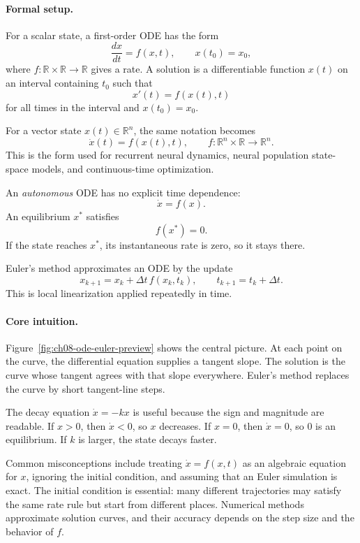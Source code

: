 \paragraph{Formal setup.}
For a scalar state, a first-order ODE has the form
\[
\frac{dx}{dt}=f(x,t),
\qquad
x(t_0)=x_0,
\]
where \(f:\mathbb{R}\times\mathbb{R}\to\mathbb{R}\) gives a rate. A solution is a differentiable function \(x(t)\) on an interval containing \(t_0\) such that
\[
x'(t)=f(x(t),t)
\]
for all times in the interval and \(x(t_0)=x_0\).

For a vector state \(x(t)\in\mathbb{R}^n\), the same notation becomes
\[
\dot x(t)=f(x(t),t),
\qquad
f:\mathbb{R}^n\times\mathbb{R}\to\mathbb{R}^n.
\]
This is the form used for recurrent neural dynamics, neural population state-space models, and continuous-time optimization.

An \emph{autonomous} ODE has no explicit time dependence:
\[
\dot x=f(x).
\]
An equilibrium \(x^\ast\) satisfies
\[
f(x^\ast)=0.
\]
If the state reaches \(x^\ast\), its instantaneous rate is zero, so it stays there.

Euler's method approximates an ODE by the update
\[
x_{k+1}=x_k+\Delta t\, f(x_k,t_k),
\qquad
t_{k+1}=t_k+\Delta t.
\]
This is local linearization applied repeatedly in time.

\paragraph{Core intuition.}
Figure~\ref{fig:ch08-ode-euler-preview} shows the central picture. At each point on the curve, the differential equation supplies a tangent slope. The solution is the curve whose tangent agrees with that slope everywhere. Euler's method replaces the curve by short tangent-line steps.

The decay equation \(\dot x=-kx\) is useful because the sign and magnitude are readable. If \(x>0\), then \(\dot x<0\), so \(x\) decreases. If \(x=0\), then \(\dot x=0\), so \(0\) is an equilibrium. If \(k\) is larger, the state decays faster.

Common misconceptions include treating \(\dot x=f(x,t)\) as an algebraic equation for \(x\), ignoring the initial condition, and assuming that an Euler simulation is exact. The initial condition is essential: many different trajectories may satisfy the same rate rule but start from different places. Numerical methods approximate solution curves, and their accuracy depends on the step size and the behavior of \(f\).

